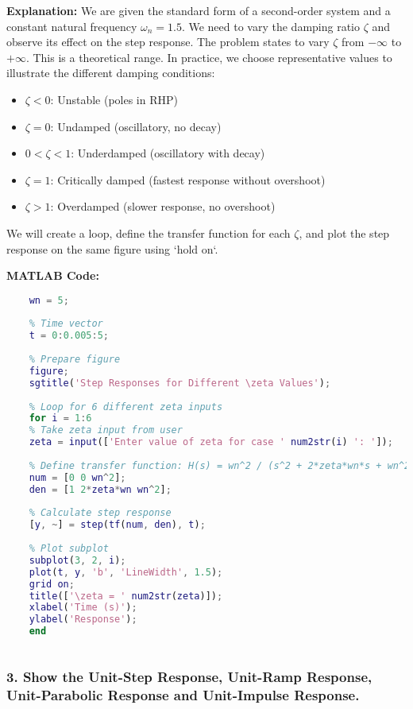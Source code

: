 \documentclass[a4paper,12pt]{article}
\begin{document}
	\textbf{Explanation:}
	We are given the standard form of a second-order system and a constant natural frequency $\omega_n = 1.5$. We need to vary the damping ratio $\zeta$ and observe its effect on the step response. The problem states to vary $\zeta$ from $-\infty$ to $+\infty$. This is a theoretical range. In practice, we choose representative values to illustrate the different damping conditions:
	\begin{itemize}
		\item $\zeta < 0$: Unstable (poles in RHP)
		\item $\zeta = 0$: Undamped (oscillatory, no decay)
		\item $0 < \zeta < 1$: Underdamped (oscillatory with decay)
		\item $\zeta = 1$: Critically damped (fastest response without overshoot)
		\item $\zeta > 1$: Overdamped (slower response, no overshoot)
	\end{itemize}
	We will create a loop, define the transfer function for each $\zeta$, and plot the step response on the same figure using `hold on`.
	
	\textbf{MATLAB Code:}
	\begin{lstlisting}[language=Matlab, caption=Step response vs damping ratio (manual)]
	% Natural frequency (assumed constant)
	wn = 5;
	
	% Time vector
	t = 0:0.005:5;
	
	% Prepare figure
	figure;
	sgtitle('Step Responses for Different \zeta Values');
	
	% Loop for 6 different zeta inputs
	for i = 1:6
	% Take zeta input from user
	zeta = input(['Enter value of zeta for case ' num2str(i) ': ']);
	
	% Define transfer function: H(s) = wn^2 / (s^2 + 2*zeta*wn*s + wn^2)
	num = [0 0 wn^2];
	den = [1 2*zeta*wn wn^2];
	
	% Calculate step response
	[y, ~] = step(tf(num, den), t);
	
	% Plot subplot
	subplot(3, 2, i);
	plot(t, y, 'b', 'LineWidth', 1.5);
	grid on;
	title(['\zeta = ' num2str(zeta)]);
	xlabel('Time (s)');
	ylabel('Response');
	end
	
\end{lstlisting}


	
	\subsubsection*{3. Show the Unit-Step Response, Unit-Ramp Response, Unit-Parabolic Response and Unit-Impulse Response.}
	
\end{document}
